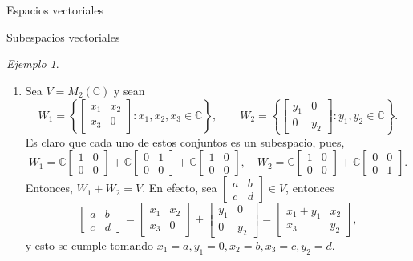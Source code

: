 \documentclass[a4paper,12pt,twoside,spanish,reqno]{amsbook}
\numberwithin{equation}{section}
\theoremstyle{definition}
\theoremstyle{remark}
\newtheorem*{ejemplo*}{Ejemplo}
\newcommand{\C}{\mathbb C}
\begin{document}
\begin{chapter}{Espacios vectoriales}
\begin{section}{Subespacios vectoriales}
\begin{ejemplo*}
\begin{enumerate}
            \item Sea $V = M_2(\C)$ y sean 
            \begin{equation*}
                W_1 = \left\{\begin{bmatrix} x_1&x_2\\x_3&0 \end{bmatrix}: x_1,x_2,x_3 \in \C \right\}, 
                \qquad W_2 = \left\{\begin{bmatrix} y_1&0\\0&y_2 \end{bmatrix}: y_1,y_2 \in \C \right\}.
            \end{equation*} 
            Es claro que cada uno de estos conjuntos es un subespacio, pues,
            $$
            W_1 = \C \begin{bmatrix} 1&0\\0&0 \end{bmatrix} +
            \C \begin{bmatrix} 0&1\\0&0 \end{bmatrix} +
            \C \begin{bmatrix} 1&0\\0&0 \end{bmatrix}, \quad 
            W_2 = \C \begin{bmatrix} 1&0\\0&0 \end{bmatrix} +
            \C \begin{bmatrix} 0&0\\0&1 \end{bmatrix}. 
            $$
            Entonces, $W_1 + W_2 = V$. En  efecto, sea 
            $\begin{bmatrix} a&b\\c&d\end{bmatrix} \in V$, entonces
            $$
            \begin{bmatrix} a&b\\c&d\end{bmatrix} =  \begin{bmatrix} x_1&x_2\\x_3&0 \end{bmatrix} + 
            \begin{bmatrix} y_1&0\\0&y_2 \end{bmatrix} =
            \begin{bmatrix} x_1+y_1&x_2\\x_3&y_2 \end{bmatrix},
            $$
            y esto se cumple  tomando $x_1 = a, y_1 =0,  x_2 = b, x_3= c, y_2 =d$.
            

\end{enumerate}
\end{ejemplo*}
\end{section}
\end{chapter}
\end{document}
